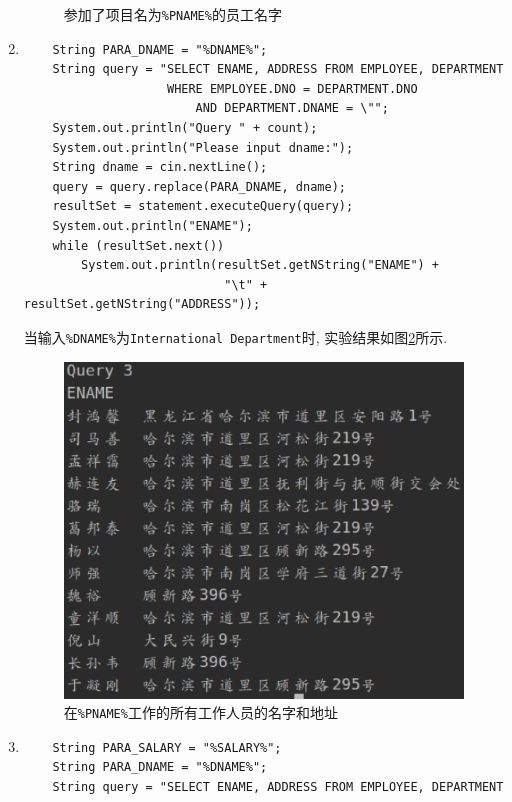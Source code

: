 \documentclass{ML}
\begin{document}
\begin{enumerate}
\begin{figure}[H]
        \caption{参加了项目名为\texttt{\%PNAME\%}的员工名字}\label{fig:3.2}
    \end{figure}
    \item \begin{verbatim}
    String PARA_DNAME = "%DNAME%";
    String query = "SELECT ENAME, ADDRESS FROM EMPLOYEE, DEPARTMENT 
                    WHERE EMPLOYEE.DNO = DEPARTMENT.DNO 
                        AND DEPARTMENT.DNAME = \"";
    System.out.println("Query " + count);
    System.out.println("Please input dname:");
    String dname = cin.nextLine();
    query = query.replace(PARA_DNAME, dname);
    resultSet = statement.executeQuery(query);
    System.out.println("ENAME");
    while (resultSet.next())
        System.out.println(resultSet.getNString("ENAME") + 
                            "\t" + resultSet.getNString("ADDRESS"));
    \end{verbatim}
    当输入\texttt{\%DNAME\%}为\texttt{International Department}时, 实验结果如图\ref{fig:3.3}所示.
    \begin{figure}[H]
        \centering
        \includegraphics[scale = 0.5, bb= 0 0 465 392]{media/3.3.eps}
        \caption{在\texttt{\%PNAME\%}工作的所有工作人员的名字和地址}\label{fig:3.3}
    \end{figure}
    \item \begin{verbatim}
    String PARA_SALARY = "%SALARY%";
    String PARA_DNAME = "%DNAME%";
    String query = "SELECT ENAME, ADDRESS FROM EMPLOYEE, DEPARTMENT 

\end{verbatim}
\end{enumerate}
\end{document}
